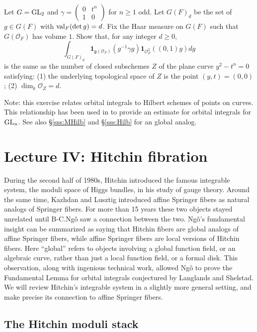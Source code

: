 \documentclass[]{pcmi}
\let\oldsubsubsection\subsubsection
\renewcommand{\subsubsection}[1]{%
\setcounter{subsubsection}{\value{equation}}%
\oldsubsubsection{#1}%
\refstepcounter{equation}%
}
\theoremstyle{plain}
\theoremstyle{definition}
\def\calO{\mathcal{O}}
\newcommand\frg{\mathfrak{g}}
\newcommand{\val}{\textup{val}}
\newcommand\GL{\textup{GL}}
\newcommand{\one}{\mathbf{1}}
\newcommand\mat[4]{\left(\begin{array}{cc} #1 & #2 \\ #3 & #4 \end{array}\right)}  %
\begin{document}
\subsubsection{} Let $G=\GL_{2}$ and $\gamma=\mat{0}{t^{n}}{1}{0}$ for $n\geq 1$ odd. Let $G(F)_{d}$ be the set of $g\in G(F)$ with $\val_{F}(\det g)=d$. Fix the Haar measure on $G(F)$ such that $G(\calO_{F})$ has volume $1$. Show that, for any integer $d\geq0$,
\begin{equation*}
\int_{G(F)_{d}}\one_{\frg(\calO_{F})}(g^{-1}\gamma g)\one_{\calO^{2}_{F}}((0,1)g)dg
\end{equation*}
is the same as the number of closed subschemes $Z$ of the plane curve $y^{2}-t^{n}=0$ satisfying: (1) the underlying topological space of $Z$ is the point $(y,t)=(0,0)$; (2) $\dim_{k}\calO_{Z}=d$.

Note: this exercise relates orbital integrals to Hilbert schemes of points on curves. This relationship has been used in \cite{Y-Orb} to provide an estimate for orbital integrals for $\GL_{n}$. See also \S\ref{sss:MHilb} and \S\ref{sss:Hilb} for an global analog.



\section{Lecture IV: Hitchin fibration} 

During the second half of 1980s, Hitchin introduced the famous integrable system, the moduli space of Higgs bundles, in his study of gauge theory. Around the same time, Kazhdan and Lusztig introduced affine Springer fibers as natural analogs of Springer fibers. For more than 15 years these two objects stayed unrelated until B-C.Ng\^o saw a connection between the two. Ng\^o's fundamental insight can be summarized as saying that Hitchin fibers are global analogs of affine Springer fibers, while affine Springer fibers are local versions of Hitchin fibers. Here ``global'' refers to objects involving a global function field, or an algebraic curve, rather than just a local function field, or a formal disk.  This observation, along with ingenious technical work, allowed Ng\^o to prove the Fundamental Lemma for orbital integrals conjectured by Langlands and Shelstad. We will review Hitchin's integrable system in a slightly more general setting, and make precise its connection to affine Springer fibers.




\subsection{The Hitchin moduli stack}
\end{document}
